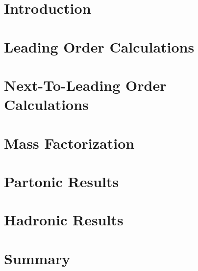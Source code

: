 \documentclass[
  english,		%
  a4paper,		%
  11pt,			%
  DIV=12,
  titlepage,
  toc=bibnumbered,
  parskip=full,  	%
  headings=normal,
  BCOR=12mm,
  numbers=noenddot
]{scrartcl}
\begin{document}
\section{Introduction}


\section{Leading Order Calculations}


\section{Next-To-Leading Order Calculations}


\section{Mass Factorization}


\section{Partonic Results}
%

\section{Hadronic Results}
%

\section{Summary}
%

\newpage
\appendix


\listoffixmes
\end{document}

